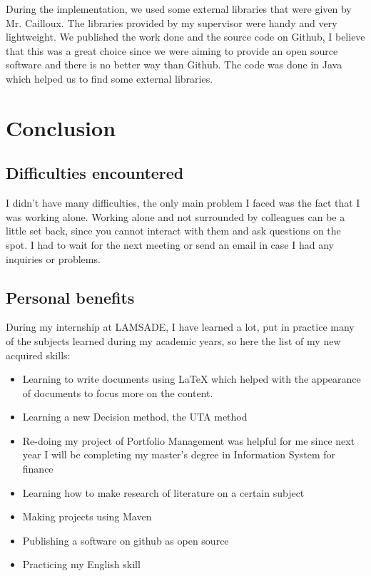 \documentclass{report}
\begin{document}
During the implementation, we used some external libraries that were given by Mr. Cailloux. The libraries provided by my supervisor were handy and very lightweight. We published the work done and the source code on Github, I believe that this was a great choice since we were aiming to provide an open source software and there is no better way than Github. The code was done in Java which helped us to find some external libraries.\\



\chapter{Conclusion}
\section{Difficulties encountered}
I didn't have many difficulties, the only main problem I faced was the fact that I was working alone. Working alone and not surrounded by colleagues can be a little set back, since you cannot interact with them and ask questions on the spot. I had to wait for the next meeting or send an email in case I had any inquiries or problems.\\

\section{Personal benefits}
During my internship at LAMSADE, I have learned a lot, put in practice many of the subjects learned during my academic years, so here the list of my new acquired skills: 
\begin{itemize}
\item Learning to write documents using LaTeX which helped with the appearance of documents to focus more on the content. 
\item Learning a new Decision method, the UTA method
\item Re-doing my project of Portfolio Management was helpful for me since next year I will be completing my master’s degree in Information System for finance
\item Learning how to make research of literature on a certain subject 
\item Making projects using Maven
\item Publishing a software on github as open source
\item Practicing my English skill\\
\end{itemize}
\end{document}
